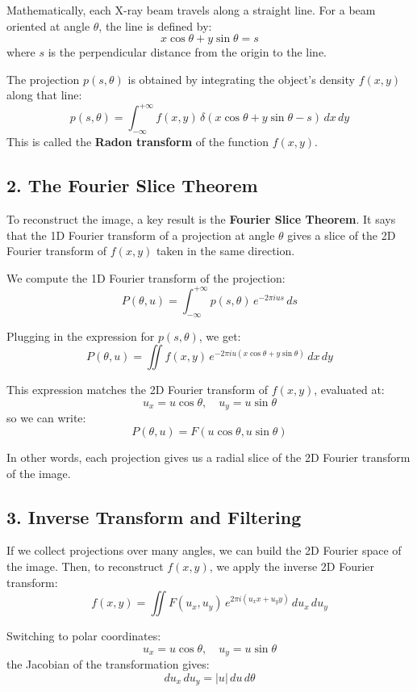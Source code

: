 Mathematically, each X-ray beam travels along a straight line. For a beam oriented at angle \( \theta \), the line is defined by:
\[
x \cos\theta + y \sin\theta = s
\]
where \( s \) is the perpendicular distance from the origin to the line.

The projection \( p(s, \theta) \) is obtained by integrating the object's density \( f(x, y) \) along that line:
\[
p(s, \theta) = \int_{-\infty}^{+\infty} f(x, y)\, \delta(x \cos\theta + y \sin\theta - s)\, dx\, dy
\]
This is called the \textbf{Radon transform} of the function \( f(x, y) \).

\subsection*{2. The Fourier Slice Theorem}

To reconstruct the image, a key result is the \textbf{Fourier Slice Theorem}. It says that the 1D Fourier transform of a projection at angle \( \theta \) gives a slice of the 2D Fourier transform of \( f(x, y) \) taken in the same direction.

We compute the 1D Fourier transform of the projection:
\[
P(\theta, u) = \int_{-\infty}^{+\infty} p(s, \theta)\, e^{-2\pi i u s}\, ds
\]

Plugging in the expression for \( p(s, \theta) \), we get:
\[
P(\theta, u) = \iint f(x, y)\, e^{-2\pi i u (x \cos\theta + y \sin\theta)}\, dx\, dy
\]

This expression matches the 2D Fourier transform of \( f(x, y) \), evaluated at:
\[
u_x = u \cos\theta,\quad u_y = u \sin\theta
\]
so we can write:
\[
P(\theta, u) = F(u \cos\theta, u \sin\theta)
\]

In other words, each projection gives us a radial slice of the 2D Fourier transform of the image.

\subsection*{3. Inverse Transform and Filtering}

If we collect projections over many angles, we can build the 2D Fourier space of the image. Then, to reconstruct \( f(x, y) \), we apply the inverse 2D Fourier transform:
\[
f(x, y) = \iint F(u_x, u_y)\, e^{2\pi i (u_x x + u_y y)}\, du_x\, du_y
\]

Switching to polar coordinates:
\[
u_x = u \cos\theta,\quad u_y = u \sin\theta
\]
the Jacobian of the transformation gives:
\[
du_x\, du_y = |u|\, du\, d\theta
\]

